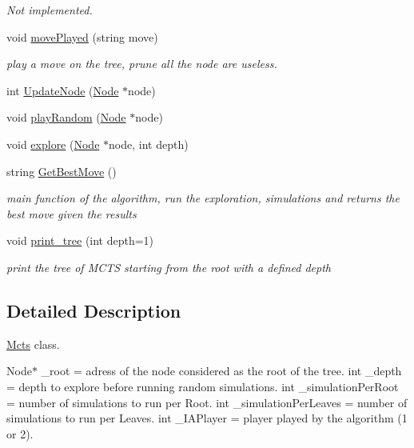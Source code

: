 \begin{DoxyCompactItemize}
\begin{DoxyCompactList}\small\item\em Not implemented. \end{DoxyCompactList}\item 
void \hyperlink{classmcts_1_1_mcts_a83371bef8912ea4785924303b16f8670}{move\+Played} (string move)
\begin{DoxyCompactList}\small\item\em play a move on the tree, prune all the node are useless. \end{DoxyCompactList}\item 
int \hyperlink{classmcts_1_1_mcts_a52f93c0ecdf18f8e1755c7d2007923b6}{Update\+Node} (\hyperlink{classmcts_1_1_node}{Node} $\ast$node)
\item 
void \hyperlink{classmcts_1_1_mcts_a63715fdb2759d46eb8627f18e80ab7dd}{play\+Random} (\hyperlink{classmcts_1_1_node}{Node} $\ast$node)
\item 
void \hyperlink{classmcts_1_1_mcts_adc027fc091dcde7913b78190b12b3bc1}{explore} (\hyperlink{classmcts_1_1_node}{Node} $\ast$node, int depth)
\item 
string \hyperlink{classmcts_1_1_mcts_a30f80b3581b1d967f2fdcc651e7773b8}{Get\+Best\+Move} ()
\begin{DoxyCompactList}\small\item\em main function of the algorithm, run the exploration, simulations and returns the best move given the results \end{DoxyCompactList}\item 
void \hyperlink{classmcts_1_1_mcts_a9ba60b877c5c772b3a2310a99f053ee8}{print\+\_\+tree} (int depth=1)
\begin{DoxyCompactList}\small\item\em print the tree of M\+C\+T\+S starting from the root with a defined depth \end{DoxyCompactList}\end{DoxyCompactItemize}


\subsection{Detailed Description}
\hyperlink{classmcts_1_1_mcts}{Mcts} class. 

Node$\ast$ \+\_\+root = adress of the node considered as the root of the tree. int \+\_\+depth = depth to explore before running random simulations. int \+\_\+simulation\+Per\+Root = number of simulations to run per Root. int \+\_\+simulation\+Per\+Leaves = number of simulations to run per Leaves. int \+\_\+\+I\+A\+Player = player played by the algorithm (1 or 2). 

